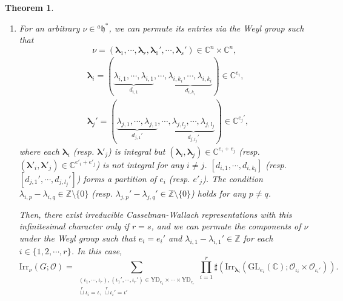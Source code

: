 \documentclass[12pt, a4paper]{amsart}
\numberwithin{equation}{section}
\newtheorem{thm}{Theorem}[section]
\newcommand{\blam}{{\boldsymbol{\lambda}}}
\newcommand{\BC}{{\mathbb {C}}}
\newcommand{\BZ}{{\mathbb {Z}}}
\newcommand{\CO}{{\mathcal {O}}}
\newcommand{\fh}{\mathfrak{h}}
\newcommand{\GL}{{\mathrm{GL}}}
\newcommand{\Irr}{{\mathrm{Irr}}}
\begin{document}
\begin{thm}
\begin{enumerate}
$$\begin{aligned}
            &1, & \textrm{if $\iota = \iota'$}.
        \end{aligned}
        \right.$$
        \item For an arbitrary $\nu \in {^{a}\fh^*}$, we can permute its entries via the Weyl group such that
        \[
        \nu = (\blam_1, \cdots, \blam_r, \blam_1', \cdots, \blam_s') \in \BC^n \times \BC^n,
        \]
        \begin{align}
            &\blam_i = (\underbrace{\lambda_{i,1}, \cdots, \lambda_{i,1}}_{d_{i,1}}, \cdots, \underbrace{\lambda_{i,k_i}, \cdots, \lambda_{i,k_i}}_{d_{i,k_i}}) \in \BC^{e_i},\\
            &\blam_j' = (\underbrace{\lambda_{j,1}, \cdots, \lambda_{j,1}}_{d_{j,1}'}, \cdots, \underbrace{\lambda_{j,l_j}, \cdots, \lambda_{j,l_j}}_{d_{j,l_j}'}) \in \BC^{e_j'},
        \end{align}
        where each $\blam_i$ (resp. $\blam'_j$) is integral but $(\blam_i,\blam_j) \in \BC^{e_i+e_j}$ (resp. $(\blam'_i,\blam'_j) \in \BC^{e'_i+e'_j}$) is not integral for any $i \neq j$. $[d_{i,1}, \cdots, d_{i,k_i}]$ (resp. $[d_{j,1}', \cdots, d_{j,l_j}']$) forms a partition of $e_i$ (resp. $e'_j$). The condition $\lambda_{i,p} - \lambda_{i,q} \in \BZ \setminus \{0\}$ (resp. $\lambda_{j,p}' - \lambda_{j,q}' \in \BZ \setminus \{0\}$) holds for any $p \neq q$. 
    
        Then, there exist irreducible Casselman-Wallach representations with this infinitesimal character only if $r = s$, and we can permute the components of $\nu$ under the Weyl group such that $e_i = e_i'$ and $\lambda_{i,1} - \lambda_{i,1}' \in \BZ$ for each $i \in \{1, 2, \cdots, r\}$. In this case, 
        \begin{equation}
            \Irr_{\nu}(G;\CO) = \sum_{\substack{(\iota_1,\cdots,\iota_r), (\iota_1',\cdots,\iota_r') \in \mathrm{YD}_{e_1} \times \cdots \times \mathrm{YD}_{e_r}\\ \mathop{\sqcup}\limits^r \iota_i = \iota, \ \mathop{\sqcup}\limits^r \iota_i' = \iota' }} \prod_{i=1}^{r} \sharp(\Irr_{\blam_i}(\GL_{e_i}(\BC);\CO_{\iota_i} \times \CO_{\iota_i'})).
        \end{equation}
    \end{enumerate}
\end{thm}
\end{document}
